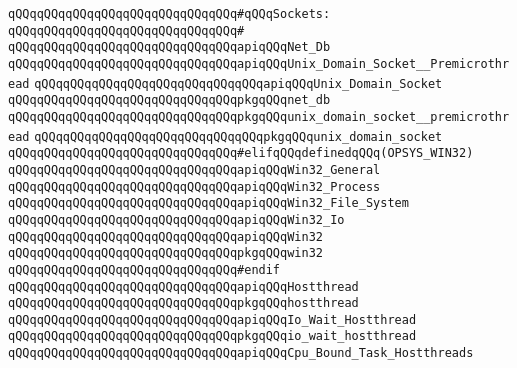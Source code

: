 \verb|qQQqqQQqqQQqqQQqqQQqqQQqqQQqqQQq#qQQqSockets:|\newline
\verb|qQQqqQQqqQQqqQQqqQQqqQQqqQQqqQQq#|\newline
\verb|qQQqqQQqqQQqqQQqqQQqqQQqqQQqqQQqapiqQQqNet_Db|\newline
\verb|qQQqqQQqqQQqqQQqqQQqqQQqqQQqqQQqapiqQQqUnix_Domain_Socket__Premicrothread|\newline
\verb|qQQqqQQqqQQqqQQqqQQqqQQqqQQqqQQqapiqQQqUnix_Domain_Socket|\newline
\newline
\verb|qQQqqQQqqQQqqQQqqQQqqQQqqQQqqQQqpkgqQQqnet_db|\newline
\verb|qQQqqQQqqQQqqQQqqQQqqQQqqQQqqQQqpkgqQQqunix_domain_socket__premicrothread|\newline
\verb|qQQqqQQqqQQqqQQqqQQqqQQqqQQqqQQqpkgqQQqunix_domain_socket|\newline
\newline
\verb|qQQqqQQqqQQqqQQqqQQqqQQqqQQqqQQq#elifqQQqdefinedqQQq(OPSYS_WIN32)|\newline
\newline
\verb|qQQqqQQqqQQqqQQqqQQqqQQqqQQqqQQqapiqQQqWin32_General|\newline
\verb|qQQqqQQqqQQqqQQqqQQqqQQqqQQqqQQqapiqQQqWin32_Process|\newline
\verb|qQQqqQQqqQQqqQQqqQQqqQQqqQQqqQQqapiqQQqWin32_File_System|\newline
\verb|qQQqqQQqqQQqqQQqqQQqqQQqqQQqqQQqapiqQQqWin32_Io|\newline
\verb|qQQqqQQqqQQqqQQqqQQqqQQqqQQqqQQqapiqQQqWin32|\newline
\newline
\verb|qQQqqQQqqQQqqQQqqQQqqQQqqQQqqQQqpkgqQQqwin32|\newline
\verb|qQQqqQQqqQQqqQQqqQQqqQQqqQQqqQQq#endif|\newline
\newline
\newline
\verb|qQQqqQQqqQQqqQQqqQQqqQQqqQQqqQQqapiqQQqHostthread|\newline
\verb|qQQqqQQqqQQqqQQqqQQqqQQqqQQqqQQqpkgqQQqhostthread|\newline
\newline
\verb|qQQqqQQqqQQqqQQqqQQqqQQqqQQqqQQqapiqQQqIo_Wait_Hostthread|\newline
\verb|qQQqqQQqqQQqqQQqqQQqqQQqqQQqqQQqpkgqQQqio_wait_hostthread|\newline
\newline
\verb|qQQqqQQqqQQqqQQqqQQqqQQqqQQqqQQqapiqQQqCpu_Bound_Task_Hostthreads|\newline
